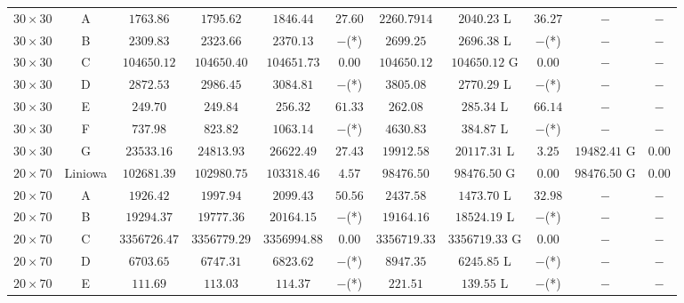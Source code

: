 \begin{table}[h!]
\begin{center}
{\begin{tabular}{c|c|c|c|c|c|c|c|c|c|c}
            $30 \times 30$ & A             & $1763.86$ & $1795.62$ & $1846.44$ & $27.60$        & $2260.7914$   & $2040.23$ L & $36.27$           & $-$ & $-$ \\
            $30 \times 30$ & B             & $2309.83$ & $2323.66$ & $2370.13$ & $-$(*)         & $2699.25$     & $2696.38$ L & $-$(*)            & $-$ & $-$ \\
            $30 \times 30$ & C             & $104650.12$ & $104650.40$ & $104651.73$ & $0.00$   & $104650.12$   & $104650.12$ G & $0.00$          & $-$ & $-$ \\
            $30 \times 30$ & D             & $2872.53$ & $2986.45$ & $3084.81$ & $-$(*)         & $3805.08$     & $2770.29$ L & $-$(*)            & $-$ & $-$ \\
            $30 \times 30$ & E             & $249.70$ & $249.84$ & $256.32$ & $61.33$           & $262.08$      & $285.34$ L & $66.14$            & $-$ & $-$ \\
            $30 \times 30$ & F             & $737.98$ & $823.82$ & $1063.14$ & $-$(*)           & $4630.83$     & $384.87$ L & $-$(*)             & $-$ & $-$ \\
            $30 \times 30$ & G             & $23533.16$ & $24813.93$ & $26622.49$ & $27.43$     & $19912.58$    & $20117.31$ L & $3.25$           & $19482.41$ G & $0.00$ \\
            \hline  
            $20 \times 70$ & Liniowa       & $102681.39$ & $102980.75$ & $103318.46$ & $4.57$   & $98476.50$    & $98476.50$ G & $0.00$           & $98476.50$ G & $0.00$ \\
            $20 \times 70$ & A             & $1926.42$ & $1997.94$ & $2099.43$ & $50.56$        & $2437.58$     & $1473.70$ L & $32.98$           & $-$ & $-$ \\
            $20 \times 70$ & B             & $19294.37$ & $19777.36$ & $20164.15$ & $-$(*)      & $19164.16$    & $18524.19$ L & $-$(*)           & $-$ & $-$ \\
            $20 \times 70$ & C             & $3356726.47$ & $3356779.29$ & $3356994.88$ & $0.00$& $3356719.33$  & $3356719.33$ G & $0.00$         & $-$ & $-$ \\
            $20 \times 70$ & D             & $6703.65$ & $6747.31$ & $6823.62$ & $-$(*)         & $8947.35$     & $6245.85$ L & $-$(*)            & $-$ & $-$ \\
            $20 \times 70$ & E             & $111.69$ & $113.03$ & $114.37$ & $-$(*)            & $221.51$      & $139.55$ L & $-$(*)             & $-$ & $-$ \\

\end{tabular}}
\end{center}
\end{table}
